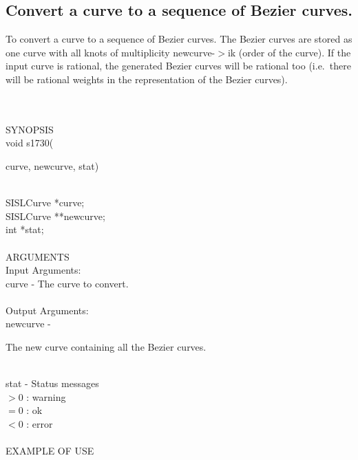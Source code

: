 \subsection{Convert a curve to a sequence of Bezier curves.}
\begin{minipg1}
  To convert a curve to a sequence of Bezier curves. The Bezier
  curves are stored as one curve with all knots of multiplicity
  newcurve-$>$ik (order of the curve).
  If the input curve is rational, the generated Bezier curves will be
  rational too (i.e.\ there will be rational weights in the
  representation of the Bezier curves).
\end{minipg1} \\ \\
SYNOPSIS\\
        \>void s1730(\begin{minipg3}
        {\fov curve}, {\fov newcurve}, {\fov stat})
                \end{minipg3}\\[0.3ex]
                \>\>    SISLCurve       \>      *{\fov curve};\\
                \>\>    SISLCurve       \>      **{\fov newcurve};\\
                \>\>    int     \>      *{\fov stat};\\
\\
ARGUMENTS\\
        \>Input Arguments:\\
        \>\>    {\fov curve}    \> - \> The curve to convert.\\
\\
        \>Output Arguments:\\
        \>\>    {\fov newcurve}\> - \>\begin{minipg2}
                                The new curve
                                containing all
                                the Bezier curves.
                                \end{minipg2}\\[0.8ex]
        \>\>    {\fov stat}     \> - \> Status messages\\
                \>\>\>\>\>              $> 0$   : warning\\
                \>\>\>\>\>              $= 0$   : ok\\
                \>\>\>\>\>              $< 0$   : error\\
\\
EXAMPLE OF USE\\
